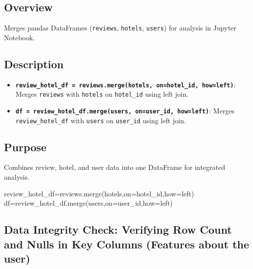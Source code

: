\documentclass[
  letterpaper,
  DIV=11,
  numbers=noendperiod]{scrartcl}
\newenvironment{Shaded}{\begin{snugshade}}{\end{snugshade}}
\newcommand{\NormalTok}[1]{\textcolor[rgb]{0.00,0.23,0.31}{#1}}
\newcommand{\OperatorTok}[1]{\textcolor[rgb]{0.37,0.37,0.37}{#1}}
\newcommand{\StringTok}[1]{\textcolor[rgb]{0.13,0.47,0.30}{#1}}
\providecommand{\tightlist}{%
  \setlength{\itemsep}{0pt}\setlength{\parskip}{0pt}}
\begin{document}
\subsection{Overview}\label{overview-2}

Merges pandas DataFrames (\texttt{reviews}, \texttt{hotels},
\texttt{users}) for analysis in Jupyter Notebook.

\subsection{Description}\label{description}

\begin{itemize}
\tightlist
\item
  \textbf{\texttt{review\_hotel\_df\ =\ reviews.merge(hotels,\ on=\textquotesingle{}hotel\_id\textquotesingle{},\ how=\textquotesingle{}left\textquotesingle{})}}:
  Merges \texttt{reviews} with \texttt{hotels} on \texttt{hotel\_id}
  using left join.
\item
  \textbf{\texttt{df\ =\ review\_hotel\_df.merge(users,\ on=\textquotesingle{}user\_id\textquotesingle{},\ how=\textquotesingle{}left\textquotesingle{})}}:
  Merges \texttt{review\_hotel\_df} with \texttt{users} on
  \texttt{user\_id} using left join.
\end{itemize}

\subsection{Purpose}\label{purpose-2}

Combines review, hotel, and user data into one DataFrame for integrated
analysis.

\begin{Shaded}
\begin{Highlighting}[]
\NormalTok{review\_hotel\_df}\OperatorTok{=}\NormalTok{reviews.merge(hotels,on}\OperatorTok{=}\StringTok{\textquotesingle{}hotel\_id\textquotesingle{}}\NormalTok{,how}\OperatorTok{=}\StringTok{\textquotesingle{}left\textquotesingle{}}\NormalTok{)}
\NormalTok{df}\OperatorTok{=}\NormalTok{review\_hotel\_df.merge(users,on}\OperatorTok{=}\StringTok{\textquotesingle{}user\_id\textquotesingle{}}\NormalTok{,how}\OperatorTok{=}\StringTok{\textquotesingle{}left\textquotesingle{}}\NormalTok{)}
\end{Highlighting}
\end{Shaded}

\subsection{Data Integrity Check: Verifying Row Count and Nulls in Key
Columns (Features about the
user)}\label{data-integrity-check-verifying-row-count-and-nulls-in-key-columns-features-about-the-user}
\end{document}
